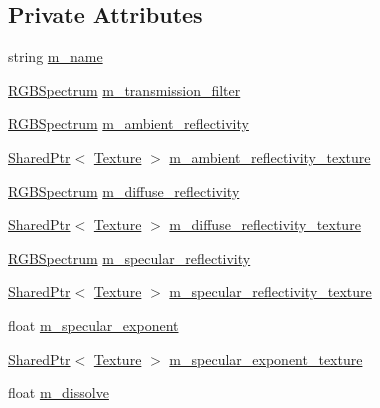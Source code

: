 \subsection*{Private Attributes}
\begin{DoxyCompactItemize}
\item 
string \hyperlink{structmage_1_1_material_a2b3e839a8ae093d53b12529d61ec6605}{m\+\_\+name}
\item 
\hyperlink{structmage_1_1_r_g_b_spectrum}{R\+G\+B\+Spectrum} \hyperlink{structmage_1_1_material_a9573a0d2a5fb0322f9eb103ace34dd47}{m\+\_\+transmission\+\_\+filter}
\item 
\hyperlink{structmage_1_1_r_g_b_spectrum}{R\+G\+B\+Spectrum} \hyperlink{structmage_1_1_material_ad8fb842410fe751ad220185271a00448}{m\+\_\+ambient\+\_\+reflectivity}
\item 
\hyperlink{namespacemage_a1e01ae66713838a7a67d30e44c67703e}{Shared\+Ptr}$<$ \hyperlink{classmage_1_1_texture}{Texture} $>$ \hyperlink{structmage_1_1_material_a72a90b9d339d705b5fd46098df5892e2}{m\+\_\+ambient\+\_\+reflectivity\+\_\+texture}
\item 
\hyperlink{structmage_1_1_r_g_b_spectrum}{R\+G\+B\+Spectrum} \hyperlink{structmage_1_1_material_afd2cc813023698e52edc01b267a17e6c}{m\+\_\+diffuse\+\_\+reflectivity}
\item 
\hyperlink{namespacemage_a1e01ae66713838a7a67d30e44c67703e}{Shared\+Ptr}$<$ \hyperlink{classmage_1_1_texture}{Texture} $>$ \hyperlink{structmage_1_1_material_a5193e30d3875695c96526a85edc84b88}{m\+\_\+diffuse\+\_\+reflectivity\+\_\+texture}
\item 
\hyperlink{structmage_1_1_r_g_b_spectrum}{R\+G\+B\+Spectrum} \hyperlink{structmage_1_1_material_a45587388f4ff57c209de2280b71af9d3}{m\+\_\+specular\+\_\+reflectivity}
\item 
\hyperlink{namespacemage_a1e01ae66713838a7a67d30e44c67703e}{Shared\+Ptr}$<$ \hyperlink{classmage_1_1_texture}{Texture} $>$ \hyperlink{structmage_1_1_material_ac925df9d71f8668c03e8efada632b300}{m\+\_\+specular\+\_\+reflectivity\+\_\+texture}
\item 
float \hyperlink{structmage_1_1_material_a62a9e8d9f90bf569b9f692c28da6a7dc}{m\+\_\+specular\+\_\+exponent}
\item 
\hyperlink{namespacemage_a1e01ae66713838a7a67d30e44c67703e}{Shared\+Ptr}$<$ \hyperlink{classmage_1_1_texture}{Texture} $>$ \hyperlink{structmage_1_1_material_a452a92691f612bd21857525c00c5e8e5}{m\+\_\+specular\+\_\+exponent\+\_\+texture}
\item 
float \hyperlink{structmage_1_1_material_a42b435ea58ce7da4b48febe9bb33aba7}{m\+\_\+dissolve}

\end{DoxyCompactItemize}
